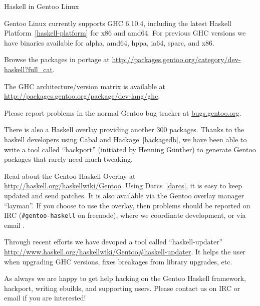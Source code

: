 \begin{hcarentry}[updated]{Haskell in Gentoo Linux}
\label{gentoo}
\makeheader

Gentoo Linux currently supports GHC 6.10.4, including the
latest Haskell Platform~\cref{haskell-platform} for x86 and amd64.
For previous GHC versions we have binaries available for alpha, amd64, hppa,
ia64, sparc, and x86.

Browse the packages in portage at 
\url{http://packages.gentoo.org/category/dev-haskell?full\_cat}.

The GHC architecture/version matrix is available at
\url{http://packages.gentoo.org/package/dev-lang/ghc}.

Please report problems in the normal Gentoo bug tracker
at \url{bugs.gentoo.org}.

There is also a Haskell overlay providing another 300 packages. Thanks to
the haskell developers using Cabal and Hackage~\cref{hackagedb}, we have been
able to write a tool called ``hackport'' (initiated by Henning G\"unther) to
generate Gentoo packages that rarely need much tweaking.

Read about the Gentoo Haskell Overlay at
\url{http://haskell.org/haskellwiki/Gentoo}. Using
Darcs~\cref{darcs}, it is easy to keep updated and send patches.
It is also available via the Gentoo overlay manager ``layman''.
If you choose to use the overlay, then problems should be
reported on
IRC (\verb+#gentoo-haskell+ on freenode), where we coordinate
development, or via email .

Through recent efforts we have devoped a tool called ``haskell-updater''
\url{http://www.haskell.org/haskellwiki/Gentoo#haskell-updater}.
It helps the user when upgrading GHC versions, fixes
breakages from library upgrades, etc.

As always we are happy to get help hacking on the Gentoo Haskell
framework, hackport, writing ebuilds, and supporting users. Please contact
us on IRC or email if you are interested!
\end{hcarentry}

